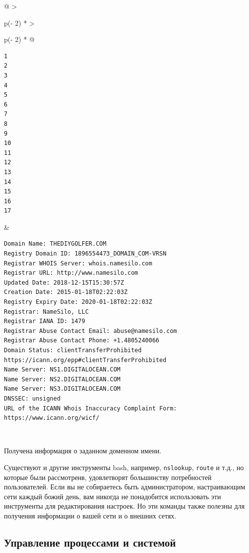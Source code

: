 \documentclass{report}
\begin{document}
\begin{longtable}[]{@{}
  >{\raggedright\arraybackslash}p{(\columnwidth - 2\tabcolsep) * }
  >{\raggedright\arraybackslash}p{(\columnwidth - 2\tabcolsep) * }@{}}
\toprule
\endhead
\begin{minipage}[t]{\linewidth}\raggedright
\begin{verbatim}
1
2
3
4
5
6
7
8
9
10
11
12
13
14
15
16
17
\end{verbatim}
\end{minipage} & \begin{minipage}[t]{\linewidth}\raggedright
\begin{verbatim}
Domain Name: THEDIYGOLFER.COM
Registry Domain ID: 1896554473_DOMAIN_COM-VRSN
Registrar WHOIS Server: whois.namesilo.com
Registrar URL: http://www.namesilo.com
Updated Date: 2018-12-15T15:30:57Z
Creation Date: 2015-01-18T02:22:03Z
Registry Expiry Date: 2020-01-18T02:22:03Z
Registrar: NameSilo, LLC
Registrar IANA ID: 1479
Registrar Abuse Contact Email: abuse@namesilo.com
Registrar Abuse Contact Phone: +1.4805240066
Domain Status: clientTransferProhibited https://icann.org/epp#clientTransferProhibited
Name Server: NS1.DIGITALOCEAN.COM
Name Server: NS2.DIGITALOCEAN.COM
Name Server: NS3.DIGITALOCEAN.COM
DNSSEC: unsigned
URL of the ICANN Whois Inaccuracy Complaint Form: https://www.icann.org/wicf/
\end{verbatim}
\end{minipage} \\ \addlinespace
\bottomrule
\end{longtable}

Получена информация о заданном доменном имени.

Существуют и другие инструменты bash, например, \texttt{nslookup},
\texttt{route} и т.д., но которые были рассмотренв, удовлетворят
большинству потребностей пользователей. Если вы не собираетесь быть
администратором, настраивающим сети каждый божий день, вам никогда не
понадобится использовать эти инструменты для редактирования настроек. Но
эти команды также полезны для получения информации о вашей сети и о
внешних сетях.

\hypertarget{Process-Management-and-System-Management}{%
\subsection{\texorpdfstring{\protect\hyperlink{Process-Management-and-System-Management}{}Управление
процессами и
системой}{Управление процессами и системой}}\label{Process-Management-and-System-Management}}
\end{document}
